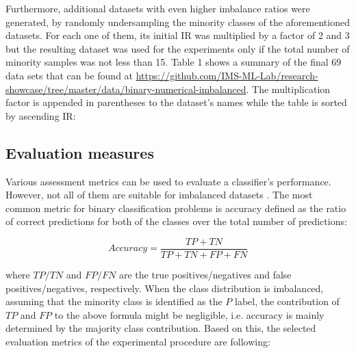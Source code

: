 \documentclass[parskip=full]{scrartcl}
\begin{document}
 Furthermore, additional datasets with even higher imbalance ratios were
 generated, by randomly undersampling the minority classes of the aforementioned
 datasets. For each one of them, its initial IR was multiplied by a factor of 2
 and 3 but the resulting dataset was used for the experiments only if the total
 number of minority samples was not less than 15. Table 1 shows a summary of the
 final 69 data sets that can be found at
 \url{https://github.com/IMS-ML-Lab/research-showcase/tree/master/data/binary-numerical-imbalanced}.
 The multiplication factor is appended in parentheses to the dataset's names
 while the table is sorted by ascending IR:


\subsection{Evaluation measures}

Various assessment metrics can be used to evaluate a classifier's performance.
However, not all of them are suitable for imbalanced datasets \cite{He2009}. The
most common metric for binary classification problems is accuracy defined as the
ratio of correct predictions for both of the classes over the total number of
predictions:

$$Accuracy = \frac{TP + TN}{TP +TN + FP + FN}$$

where \(TP / TN\) and \(FP / FN\) are the true positives/negatives and false
positives/negatives, respectively. When the class distribution is imbalanced,
assuming that the minority class is identified as the \(P\) label, the
contribution of \(TP\) and \(FP\) to the above formula might be negligible, i.e.
accuracy is mainly determined by the majority class contribution. Based on this,
the selected evaluation metrics of the experimental procedure are following:
\end{document}
